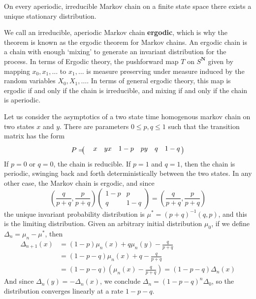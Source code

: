 \begin{corollary}
    On every aperiodic, irreducible Markov chain on a finite state space there exists a unique stationary distribution.
\end{corollary}

We call an irreducible, aperiodic Markov chain {\bf ergodic}, which is why the theorem is known as the ergodic theorem for Markov chains. An ergodic chain is a chain with enough `mixing' to generate an invariant distribution for the process. In terms of Ergodic theory, the pushforward map $T$ on $S^{\mathbf{N}}$ given by mapping $x_0, x_1, \dots$ to $x_1, \dots$ is measure preserving under measure induced by the random variables $X_0, X_1, \dots$. In terms of general ergodic theory, this map is ergodic if and only if the chain is irreducible, and mixing if and only if the chain is aperiodic.

\begin{example}
    Let us consider the asymptotics of a two state time homogenous markov chain on two states $x$ and $y$. There are parameters $0 \leq p,q \leq 1$ such that the transition matrix has the form
    \[ P = \bordermatrix{ & x & y \\ x & 1-p & p \\ y & q & 1-q } \]
    If $p = 0$ or $q = 0$, the chain is reducible. If $p = 1$ and $q = 1$, then the chain is periodic, swinging back and forth deterministically between the two states. In any other case, the Markov chain is ergodic, and since
    \[ \left( \frac{q}{p + q}, \frac{p}{p + q} \right) \begin{pmatrix} 1-p & p \\ q & 1-q \end{pmatrix} = \left( \frac{q}{p+q}, \frac{p}{p+q} \right) \]
    the unique invariant probability distribution is $\mu^* = (p + q)^{-1}(q,p)$, and this is the limiting distribution. Given an arbitrary initial distribution $\mu_0$,  if we define $\Delta_n = \mu_n - \mu^*$, then
    \begin{align*}
        \Delta_{n+1}(x) &= (1-p) \mu_n(x) + q \mu_n(y) - \frac{q}{p+q}\\
        &= (1 - p - q) \mu_n(x) + q - \frac{q}{p+q}\\
        &= (1 - p - q) \left(\mu_n(x) - \frac{q}{p+q} \right) = (1 - p - q) \Delta_n(x)
    \end{align*}
    And since $\Delta_n(y) = -\Delta_n(x)$, we conclude $\Delta_n = (1 - p - q)^n \Delta_0$, so the distribution converges linearly at a rate $1 - p - q$.
\end{example}

